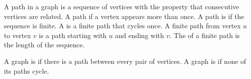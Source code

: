 

A path in a graph is a sequence of vertices with the property that consecutive vertices are related.
A path  if a vertex appears more than once.
A path is  if the sequence is finite.
A  is a finite path that cycles once.
A finite path from vertex $u$ to vertex $v$
is a path starting with $u$ and
ending with $v$.
The  of a finite path is
the length of the sequence.


A graph is 
if there is a path between every pair
of vertices. A graph is
 if none of its
paths cycle.
\strats
